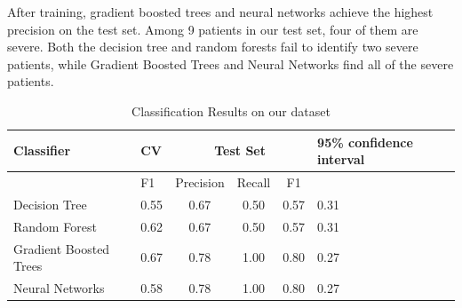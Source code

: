 After training, gradient boosted trees and neural networks achieve the highest precision on the test set. Among 9 patients in our test set, four of them are severe. Both the decision tree and random forests fail to identify two severe patients, while Gradient Boosted Trees and Neural Networks find all of the severe patients. 

\begin{table}[H]
\centering
\caption{Classification Results on our dataset}
\begin{tabular}{p{2cm}p{1.1cm}cccp{1cm}}
\toprule
Classifier    & CV & \multicolumn{3}{c}{Test Set} & 95\% confidence interval \\ \midrule
                        & F1     & Precision  & Recall  & F1    &\\
Decision Tree           & 0.55   & 0.67       & 0.50    & 0.57  & 0.31\\
Random Forest           & 0.62   & 0.67       & 0.50    & 0.57  & 0.31\\
Gradient Boosted Trees  & 0.67   & 0.78       & 1.00    & 0.80  & 0.27\\
Neural Networks         & 0.58   & 0.78       & 1.00    & 0.80  & 0.27\\ \bottomrule
\end{tabular}
\end{table}


